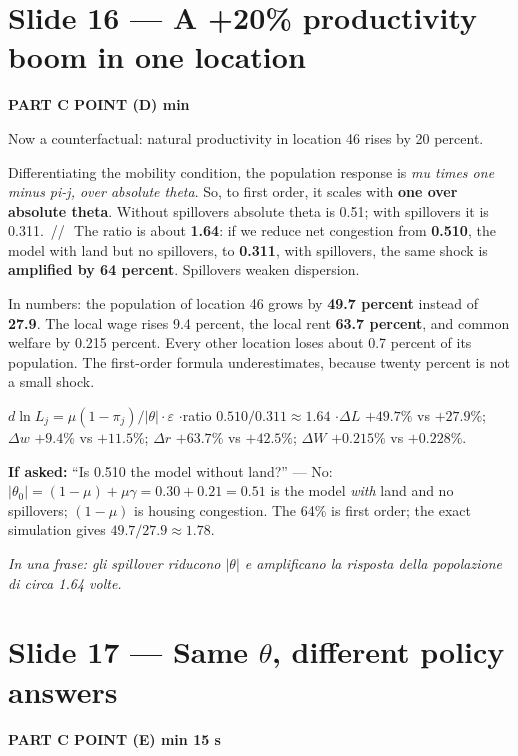 \documentclass[11pt,a4paper]{article}
\newcommand{\slide}[3]{\Needspace{14\baselineskip}\section{#1}\textcolor{unicared}{\small\bfseries\MakeUppercase{#3}\quad\textperiodcentered\quad #2}\par}
\newcommand{\idea}[1]{\par{\small\itshape\color{unicablue}In una frase: #1}\par}
\newcommand{\pause}{\textcolor{unicared}{\,/\!/\,}}
\begin{document}
\slide{Slide 16 --- A +20\% productivity boom in one location}{1 min}{Part C \textperiodcentered{} point (d)}

\begin{say}
Now a counterfactual: natural productivity in location 46 rises by 20 percent.

Differentiating the mobility condition, the population response is \emph{mu times one minus pi-j, over absolute theta}. So, to first order, it scales with \textbf{one over absolute theta}. Without spillovers absolute theta is 0.51; with spillovers it is 0.311. \pause\ The ratio is about \textbf{1.64}: if we reduce net congestion from \textbf{0.510}, the model with land but no spillovers, to \textbf{0.311}, with spillovers, the same shock is \textbf{amplified by 64 percent}. Spillovers weaken dispersion.

In numbers: the population of location 46 grows by \textbf{49.7 percent} instead of \textbf{27.9}. The local wage rises 9.4 percent, the local rent \textbf{63.7 percent}, and common welfare by 0.215 percent. Every other location loses about 0.7 percent of its population. The first-order formula underestimates, because twenty percent is not a small shock.
\end{say}

\begin{nums}
$d\ln L_j = \mu(1-\pi_j)/|\theta|\cdot\varepsilon$ \quad$\cdot$\quad ratio $0.510/0.311 \approx 1.64$ \quad$\cdot$\quad $\Delta L$ $+49.7\%$ vs $+27.9\%$; $\Delta w$ $+9.4\%$ vs $+11.5\%$; $\Delta r$ $+63.7\%$ vs $+42.5\%$; $\Delta W$ $+0.215\%$ vs $+0.228\%$.
\end{nums}
\begin{ask}
\textbf{If asked:} ``Is 0.510 the model without land?'' --- No: $|\theta_0| = (1-\mu)+\mu\gamma = 0.30 + 0.21 = 0.51$ is the model \emph{with} land and no spillovers; $(1-\mu)$ is housing congestion. The 64\% is first order; the exact simulation gives $49.7/27.9 \approx 1.78$.
\end{ask}
\idea{gli spillover riducono $|\theta|$ e amplificano la risposta della popolazione di circa 1.64 volte.}

\slide{Slide 17 --- Same $\theta$, different policy answers}{1 min 15 s}{Part C \textperiodcentered{} point (e)}
\end{document}
